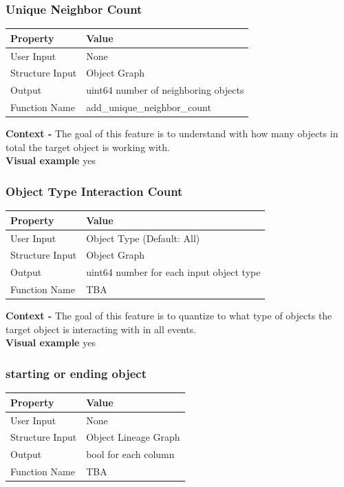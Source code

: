 \documentclass{article}
\begin{document}
\subsubsection{Unique Neighbor Count}
\begin{center}
	\begin{tabular}{| p{3cm} p{7cm} |}
		\hline
		\textbf{Property} & \textbf{Value}\\
		\hline
		User Input & None\\
		Structure Input & Object Graph\\
		Output & uint64 number of neighboring objects\\
		Function Name & add\_unique\_neighbor\_count\\
		\hline
	\end{tabular}
\end{center}

\textbf{Context -} The goal of this feature is to understand with how many objects in total the target object is working with.
\\

\textbf{Visual example}
yes
\subsubsection{Object Type Interaction Count}
\begin{center}
	\begin{tabular}{| p{3cm} p{7cm} |}
		\hline
		\textbf{Property} & \textbf{Value}\\
		\hline
		User Input & Object Type (Default: All)\\
		Structure Input & Object Graph\\
		Output & uint64 number for each input object type\\
		Function Name & TBA\\
		\hline
	\end{tabular}
\end{center}

\textbf{Context -} The goal of this feature is to quantize to what type of objects the target object is interacting with in all events.
\\

\textbf{Visual example}
yes
\subsubsection{starting or ending object}
\begin{center}
	\begin{tabular}{| p{3cm} p{7cm} |}
		\hline
		\textbf{Property} & \textbf{Value}\\
		\hline
		User Input & None\\
		Structure Input & Object Lineage Graph\\
		Output & bool for each column\\
		Function Name & TBA\\
		\hline
	\end{tabular}
\end{center}
\end{document}
